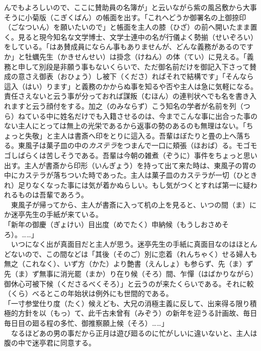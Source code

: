 んでもよろしいので、ここに賛助員の名簿が」と云いながら紫の風呂敷から大事そうに小菊版（こぎくばん）の帳面を出す。「これへどうか御署名の上御捺印（ごなついん）を願いたいので」と帳面を主人の膝（ひざ）の前へ開いたまま置く。見ると現今知名な文学博士、文学士連中の名が行儀よく勢揃（せいぞろい）をしている。「はあ賛成員にならん事もありませんが、どんな義務があるのですか」と牡蠣先生（かきせんせい）は掛念（けねん）の体（てい）に見える。「義務と申して別段是非願う事もないくらいで、ただ御名前だけを御記入下さって賛成の意さえ御表（おひょう）し被下（くださ）ればそれで結構です」「そんなら這入（はい）ります」と義務のかからぬ事を知るや否や主人は急に気軽になる。責任さえないと云う事が分っておれば謀叛（むほん）の連判状へでも名を書き入れますと云う顔付をする。加之（のみならず）こう知名の学者が名前を列（つら）ねている中に姓名だけでも入籍させるのは、今までこんな事に出合った事のない主人にとっては無上の光栄であるから返事の勢のあるのも無理はない。「ちょっと失敬」と主人は書斎へ印をとりに這入る。吾輩はぼたりと畳の上へ落ちる。東風子は菓子皿の中の\emph{カステラ}をつまんで一口に頬張（ほおば）る。モゴモゴしばらくは苦しそうである。吾輩は今朝の雑煮（ぞうに）事件をちょっと思い出す。主人が書斎から印形（いんぎょう）を持って出て来た時は、東風子の胃の中にカステラが落ちついた時であった。主人は菓子皿のカステラが一切（ひときれ）足りなくなった事には気が着かぬらしい。もし気がつくとすれば第一に疑われるものは吾輩であろう。\\
　東風子が帰ってから、主人が書斎に入って机の上を見ると、いつの間（ま）にか迷亭先生の手紙が来ている。\\

「新年の御慶（ぎょけい）目出度（めでたく）申納候（もうしおさめそろ）。\ldots{}\ldots{}」\\

　いつになく出が真面目だと主人が思う。迷亭先生の手紙に真面目なのはほとんどないので、この間などは「其後（そのご）別に恋着（れんちゃく）せる婦人も無之（これなく）、いず方（かた）より艶書（えんしょ）も参らず、先（ま）ず先（ま）ず無事に消光罷（まか）り在り候（そろ）間、乍憚（はばかりながら）御休心可被下候（くださるべくそろ）」と云うのが来たくらいである。それに較（くら）べるとこの年始状は例外にも世間的である。\\

「一寸参堂仕り度（たく）候えども、大兄の消極主義に反して、出来得る限り積極的方針を以（もっ）て、此千古未曾有（みぞう）の新年を迎うる計画故、毎日毎日目の廻る程の多忙、御推察願上候（そろ）\ldots{}\ldots{}」\\

　なるほどあの男の事だから正月は遊び廻るのに忙がしいに違いないと、主人は腹の中で迷亭君に同意する。\\

